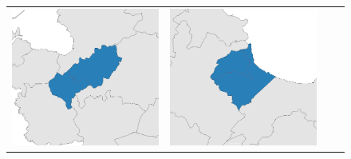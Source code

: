 \begin{figure}[p]
\begin{tabularx}{1\textwidth}{XXXX}
\includegraphics[width=1\linewidth]{images/ch6/mergefocus/07}&
\includegraphics[width=1\linewidth]{images/ch6/mergefocus/08} \\

\end{tabularx}
\end{figure}
